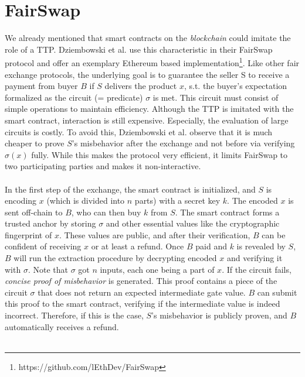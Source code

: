 \documentclass{cacthesis}
\newcounter{protocol}
\begin{document}
        \section{FairSwap}
        \label{sec:FairSwap}
        We already mentioned that smart contracts on the \textit{blockchain} could imitate the role of a TTP. Dziembowski et al. use this characteristic in their FairSwap protocol \cite{10.1145/3243734.3243857} and offer an exemplary Ethereum based implementation\footnote{https://github.com/lEthDev/FairSwap}. Like other fair exchange protocols, the underlying goal is to guarantee the seller S to receive a payment from buyer $B$ if $S$ delivers the product $x$, s.t. the buyer's expectation formalized as the circuit (= predicate) $\sigma$ is met. This circuit must consist of simple operations to maintain efficiency. Although the TTP is imitated with the smart contract, interaction is still expensive. Especially, the evaluation of large circuits is costly. To avoid this, Dziembowski et al. observe that it is much cheaper to prove $S$'s misbehavior after the exchange and not before via verifying $\sigma(x)$ fully. While this makes the protocol very efficient, it limits FairSwap to two participating parties and makes it non-interactive. \\\\
        In the first step of the exchange, the smart contract is initialized, and $S$ is encoding $x$ (which is divided into $n$ parts) with a secret key $k$. The encoded $x$ is sent off-chain to $B$, who can then buy $k$ from $S$. The smart contract forms a trusted anchor by storing $\sigma$ and other essential values like the cryptographic fingerprint of $x$. These values are public, and after their verification, $B$ can be confident of receiving $x$ or at least a refund. Once $B$ paid and $k$ is revealed by $S$, $B$ will run the extraction procedure by decrypting encoded $x$ and verifying it with $\sigma$. Note that $\sigma$ got $n$ inputs, each one being a part of $x$. If the circuit fails, \textit{concise proof of misbehavior} is generated. This proof contains a piece of the circuit $\sigma$ that does not return an expected intermediate gate value. $B$ can submit this proof to the smart contract, verifying if the intermediate value is indeed incorrect. Therefore, if this is the case, $S$'s misbehavior is publicly proven, and $B$ automatically receives a refund. \\\\
\end{document}
